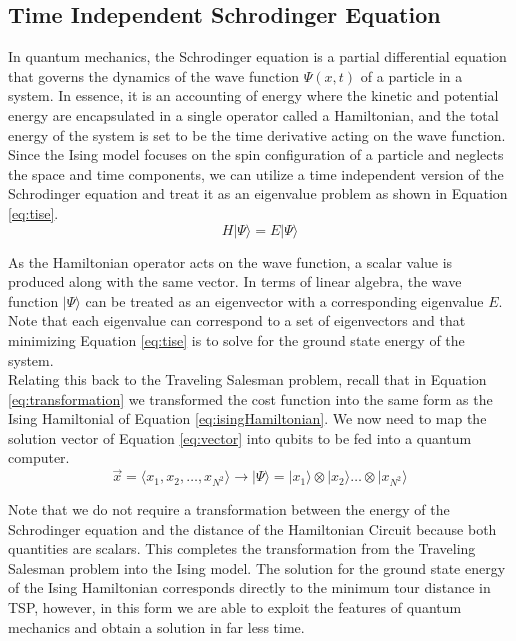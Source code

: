 \subsection{Time Independent Schrodinger Equation}
In quantum mechanics, the Schrodinger equation is a partial differential equation that governs the dynamics of the wave function $\Psi(x,t)$ of a particle in a system. 
In essence, it is an accounting of energy where the kinetic and potential energy are encapsulated in a single operator called a Hamiltonian, and the total energy of the system is set to be the time derivative acting on the wave function. 
Since the Ising model focuses on the spin configuration of a particle and neglects the space and time components, we can utilize a time independent version of the Schrodinger equation and treat it as an eigenvalue problem as shown in Equation \ref{eq:tise}. 
\begin{equation}
	H | \Psi \rangle = E | \Psi \rangle
	\label{eq:tise}
\end{equation}

As the Hamiltonian operator acts on the wave function, a scalar value is produced along with the same vector. 
In terms of linear algebra, the wave function $| \Psi \rangle$ can be treated as an eigenvector with a corresponding eigenvalue $E$. 
Note that each eigenvalue can correspond to a set of eigenvectors and that minimizing Equation \ref{eq:tise} is to solve for the ground state energy of the system. \\


Relating this back to the Traveling Salesman problem, recall that in Equation \ref{eq:transformation} we transformed the cost function into the same form as the Ising Hamiltonial of Equation \ref{eq:isingHamiltonian}. We now need to map the solution vector of Equation \ref{eq:vector} into qubits to be fed into a quantum computer. 
\begin{equation}
	\vec{x} = \langle x_1, x_2, \dots, x_{N^2} \rangle \rightarrow |\Psi\rangle = |x_1\rangle \otimes |x_2\rangle \dots \otimes  |x_{N^2}\rangle 
\end{equation}

Note that we do not require a transformation between the energy of the Schrodinger equation and the distance of the Hamiltonian Circuit because both quantities are scalars. This completes the transformation from the Traveling Salesman problem into the Ising model. The solution for the ground state energy of the Ising Hamiltonian corresponds directly to the minimum tour distance in TSP, however, in this form we are able to exploit the features of quantum mechanics and obtain a solution in far less time. 